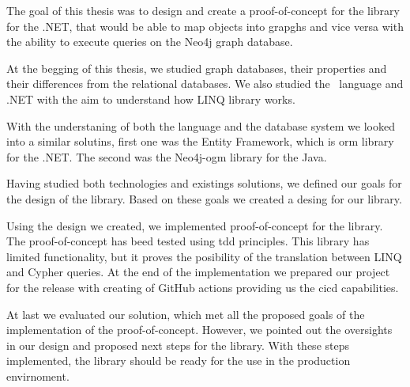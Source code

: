 \begin{conclusion}

    The goal of this thesis was to design and create a proof-of-concept for the library for the .NET, that would be able to map objects into grapghs
    and vice versa with the ability to execute queries on the Neo4j graph database.

    At the begging of this thesis, we studied graph databases, their properties and their differences from the relational databases.
    We also studied the \CS\ language and .NET with the aim to understand how LINQ library works.

    With the understaning of both the language and the database system we looked into a similar solutins, first one was the
    Entity Framework, which is \acrshort{orm} library for the .NET. The second was the Neo4j-\acrshort{ogm} library for the Java.

    Having studied both technologies and existings solutions, we defined our goals for the design of the library. Based on these goals
    we created a desing for our library.

    Using the design we created, we implemented proof-of-concept for the library. The proof-of-concept has beed tested using \acrshort{tdd}
    principles. This library has limited functionality, but it proves the posibility of the translation between LINQ and Cypher queries.
    At the end of the implementation we prepared our project for the release with creating of GitHub actions providing us the \acrshort{cicd}
    capabilities.

    At last we evaluated our solution, which met all the proposed goals of the implementation of the proof-of-concept.
    However, we pointed out the oversights in our design and proposed next steps for the library.
    With these steps implemented, the library should be ready for the use in the production envirnoment.


\end{conclusion}